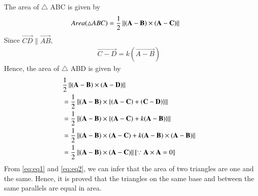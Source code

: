 \documentclass[journal,12pt,twocolumn]{IEEEtran}
\begin{document}
The area of $\triangle$ ABC is given by
\begin{align} 
	  Area(\triangle ABC) &= \frac{1}{2}\left\lVert(\mathbf{A} - \mathbf{B}) \times (\mathbf{A} - \mathbf{C})\right\rVert\label{eq:eq1}
\end{align}
Since $\vec{CD} \parallel \vec{AB}$,
\begin{align}\label{eq:fact1} \vec{C-D} = k(\vec{A-B})\end{align}
Hence, the area of $\triangle$ ABD is given by
\begin{align}
&\frac{1}{2}\left\lVert\left(\mathbf{A}-\mathbf{B}\right) \times \left(\mathbf{A}-\mathbf{D}\right)\right\rVert\\ 
&=\frac{1}{2}\left\lVert(\mathbf{A}-\mathbf{B}) \times \left\{\left(\mathbf{A}-\mathbf{C}\right) + \left(\mathbf{C}-\mathbf{D}\right)\right\}\right\rVert\\
&=\frac{1}{2}\left\lVert(\mathbf{A}-\mathbf{B}) \times  \left\{(\mathbf{A}-\mathbf{C}) + k(\mathbf{A}-\mathbf{B})\right\}\right\rVert\\
&=\frac{1}{2}\left\lVert(\mathbf{A}-\mathbf{B})\times(\mathbf{A}-\mathbf{C})+k(\mathbf{A}-\mathbf{B})\times (\mathbf{A}-\mathbf{B})\right\rVert\\
&=\frac{1}{2}\left\lVert(\mathbf{A}-\mathbf{B})\times(\mathbf{A} - \mathbf{C})\right\rVert[\because \mathbf{A} \times \mathbf{A} =0] \label{eq:eq2}
\end{align}
From \eqref{eq:eq1} and \eqref{eq:eq2}, we can infer that the area of two triangles are one and the same.
Hence, it is proved that the triangles on the same base and between the same parallels are equal in area.
\end{document}

